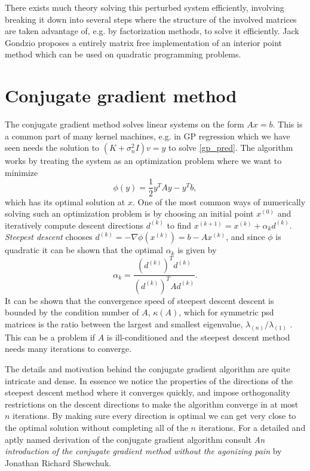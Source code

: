 \documentclass{article}
\theoremstyle{plain}
\theoremstyle{definition}
\theoremstyle{remark}
\begin{document}
There exists much theory solving this perturbed system efficiently, involving breaking it down into several steps where the structure of the involved matrices are taken advantage of, e.g. by factorization methods, to solve it efficiently.
Jack Gondzio \cite{gondzio} proposes a entirely matrix free implementation of an interior point method which can be used on quadratic programming problems.



\section{Conjugate gradient method}
The conjugate gradient method solves linear systems on the form $Ax = b$.
This is a common part of many kernel machines, e.g. in GP regression which we have seen needs the solution to $(K + \sigma_n^2I)v = y$ to solve \eqref{gp_pred}.
The algorithm works by treating the system as an optimization problem where we want to minimize 
\begin{equation}
        \label{potential}
        \phi (y) = \frac{1}{2}y^T Ay - y^Tb,
\end{equation}
which has its optimal solution at $x$.
One of the most common ways of numerically solving such an optimization problem is by choosing an initial point $x^{(0)}$ and iteratively compute descent directions $d^{(k)}$ to find $x^{(k+1)} = x^{(k)} + \alpha_k d^{(k)}$.
\textit{Steepest descent} chooses $d^{(k)} = -\nabla \phi (x^{(k)}) = b - Ax^{(k)}$, and since $\phi$ is quadratic it can be shown \cite{quarteroni} that the optimal $\alpha_k$ is given by
\begin{equation*}
        \alpha_k = \frac{(d^{(k)})^Td^{(k)}}{(d^{(k)})^TAd^{(k)}}.
\end{equation*}
It can be shown that the convergence speed of steepest descent descent is bounded by the condition number of $A$, $\kappa(A)$, which for symmetric psd matrices is the ratio between the largest and smallest eigenvalue, $\lambda_{(n)}/\lambda_{(1)}$ \cite{shewchuk}.
This can be a problem if $A$ is ill-conditioned and the steepest descent method needs many iterations to converge.


The details and motivation behind the conjugate gradient algorithm are quite intricate and dense.
In essence we notice the properties of the directions of the steepest descent method where it converges quickly, and impose orthogonality restrictions on the descent directions to make the algorithm converge in at most $n$ iterations.
By making sure every direction is optimal we can get very close to the optimal solution without completing all of the $n$ iterations.
For a detailed and aptly named derivation of the conjugate gradient algorithm consult \textit{An introduction of the conjugate gradient method without the agonizing pain} \cite{shewchuk} by Jonathan Richard Shewchuk.
\end{document}
